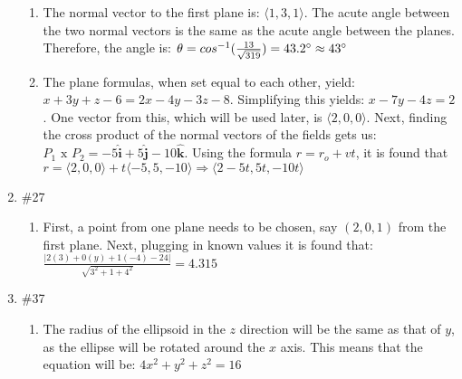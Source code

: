 \documentclass[12pt]{article}
\begin{document}
\begin{enumerate}
\begin{enumerate}
        \item The normal vector to the first plane is: $\langle 1, 3, 1 \rangle$. The acute angle between the two normal vectors is the same as the acute angle between the planes. Therefore, the angle is: $\theta=cos^{-1}(\frac{13}{\sqrt{319}})=43.2\degree\approx43\degree$

        \item The plane formulas, when set equal to each other, yield: $x+3y+z-6=2x-4y-3z-8$. Simplifying this yields: $x-7y-4z=2$. One vector from this, which will be used later, is $\langle 2, 0, 0 \rangle$. Next, finding the cross product of the normal vectors of the fields gets us: $P_1 \text{ x } P_2=-5\hat{\textbf{i}}+5\hat{\textbf{j}}-10\hat{\textbf{k}}$. Using the formula $r=r_o + vt$, it is found that $r= \langle 2, 0, 0 \rangle + t\langle -5, 5, -10 \rangle\Longrightarrow \langle 2-5t, 5t, -10t \rangle$

      \end{enumerate}

    \item \#27 \begin{enumerate}

        \item First, a point from one plane needs to be chosen, say $(2, 0, 1)$ from the first plane. Next, plugging in known values it is found that: $\frac{|2(3)+0(y)+1(-4)-24|}{\sqrt{3^2+1+4^2}}=4.315$

      \end{enumerate}

    \item \#37 \begin{enumerate}

        \item The radius of the ellipsoid in the $z$ direction will be the same as that of $y$, as the ellipse will be rotated around the $x$ axis. This means that the equation will be: $4x^2+y^2+z^2=16$

      \end{enumerate}


\end{enumerate}
\end{document}
